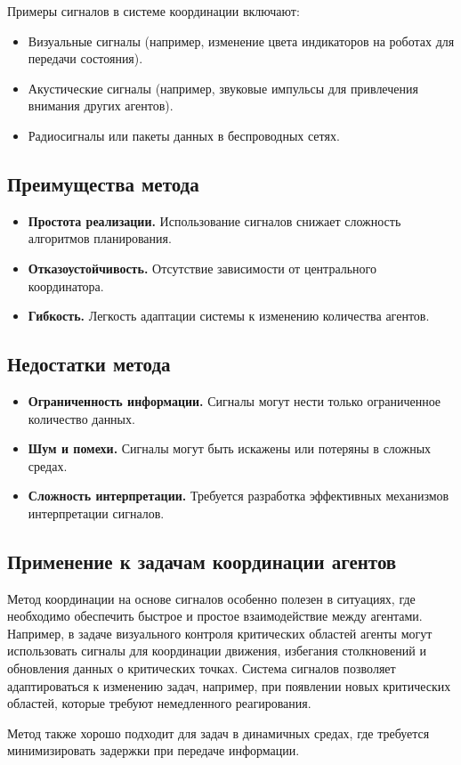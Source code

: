 Примеры сигналов в системе координации включают:
\begin{itemize}
	\item Визуальные сигналы (например, изменение цвета индикаторов на роботах для передачи состояния).
	\item Акустические сигналы (например, звуковые импульсы для привлечения внимания других агентов).
	\item Радиосигналы или пакеты данных в беспроводных сетях.
\end{itemize}

\subsection{Преимущества метода}

\begin{itemize}
	\item \textbf{Простота реализации.} Использование сигналов снижает сложность алгоритмов планирования.
	\item \textbf{Отказоустойчивость.} Отсутствие зависимости от центрального координатора.
	\item \textbf{Гибкость.} Легкость адаптации системы к изменению количества агентов.
\end{itemize}

\subsection{Недостатки метода}

\begin{itemize}
	\item \textbf{Ограниченность информации.} Сигналы могут нести только ограниченное количество данных.
	\item \textbf{Шум и помехи.} Сигналы могут быть искажены или потеряны в сложных средах.
	\item \textbf{Сложность интерпретации.} Требуется разработка эффективных механизмов интерпретации сигналов.
\end{itemize}

\subsection{Применение к задачам координации агентов}

Метод координации на основе сигналов особенно полезен в ситуациях, где необходимо обеспечить быстрое и простое взаимодействие между агентами.  
Например, в задаче визуального контроля критических областей агенты могут использовать сигналы для координации движения, избегания столкновений и обновления данных о критических точках.  
Система сигналов позволяет адаптироваться к изменению задач, например, при появлении новых критических областей, которые требуют немедленного реагирования.

Метод также хорошо подходит для задач в динамичных средах, где требуется минимизировать задержки при передаче информации.
\fi